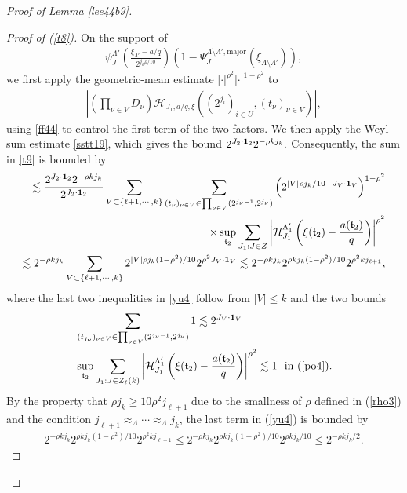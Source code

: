 \documentclass[11 pt,letterpaper]{amsart}
\theoremstyle{plain}
\theoremstyle{definition}
\theoremstyle{remark} \theoremstyle{exam} \theoremstyle{ob}
\numberwithin{equation}{section}
\begin{document}
\begin{proof}[Proof of Lemma \ref{lee44b9}]
\begin{proof}[Proof of (\ref{t8})]
On the support of
\begin{align*}
	\psi_J^{\Lambda'}\left(
	\frac{\xi_{\Lambda'}-a/q}{2^{j_k\rho/10}}
	\right)
	\left(
	1-\Psi_J^{\Lambda\setminus\Lambda',\mathrm{major}}
	(\xi_{\Lambda\setminus\Lambda'})
	\right),
\end{align*}
we first apply the geometric-mean estimate
$|\cdot|^{\rho^2}|\cdot|^{1-\rho^2}$ to
\begin{align*}
	\left|\left(\prod_{\nu\in V}\bar{D}_\nu\right)
	\mathcal{H}_{J_1,a/q,\xi}
	\left(
	(2^{j_i})_{i\in U},
	(t_\nu)_{\nu\in V}
	\right)\right|,
\end{align*}
using \eqref{ff44} to control the first term of the two factors. We then apply the Weyl-sum estimate \eqref{sstt19}, which gives the bound $2^{J_2\cdot{\bf 1}_2}2^{-\rho k j_k}.$
Consequently, the sum in \eqref{t9} is bounded by
\begin{align}\label{yu4}
 \lesssim  \frac{ 2^{J_2\cdot {\bf 1}_2} 2^{-\rho k j_k}}{2^{J_2\cdot {\bf 1}_2}}   \sum_{V\subset \{\ell+1,\cdots,k\}}
 \sum_{(t_\nu)_{\nu\in V}\in \prod_{\nu\in V}(2^{j_\nu-1},2^{j_\nu})}\left(2^{|V| \rho j_k /10-J_V\cdot {\bf 1}_{V}} \right)^{1-\rho^2}\notag\\
 \times
\sup_{\mathfrak{t}_2}\sum_{J_1:J\in Z} \left|\mathcal{H}^{\Lambda'_{1}}_{J_{1}}\left(\xi(\mathfrak{t}_2)-\frac{a(\mathfrak{t}_2)}{q}\right) \right|^{\rho^2}\notag\\
 \lesssim 2^{-\rho k j_k}  \sum_{V\subset \{\ell+1,\cdots,k\}} 2^{|V| \rho j_k(1-\rho^2) /10}  2^{\rho^2 J_V\cdot {\bf 1}_V}\lesssim 2^{-\rho k j_k} 2^{  \rho k j_k(1-\rho^2) /10}  2^{\rho^2 k j_{\ell+1}},
\end{align}
where the last  two inequalities in \eqref{yu4} follow   from $|V|\le k$ and the two bounds
\begin{align*}
&\sum_{(t_{j_\nu})_{\nu\in V}\in \prod_{\nu\in V}(2^{j_\nu-1},2^{j_\nu})} 1 \lesssim 2^{J_V\cdot {\bf 1}_V}\\
&\sup_{\mathfrak{t}_2}\sum_{J_1:J\in Z_{\ell}(k)}  \left|\mathcal{H}^{\Lambda'_{1}}_{J_{1}}\left(\xi(\mathfrak{t}_2)-\frac{a(\mathfrak{t}_2)}{q}\right) \right|^{\rho^{2}} \lesssim 1 \ \text{ in (\ref{po4}).}
\end{align*}
By the property that      $\rho   j_k\ge 10  \rho^2   j_{\ell+1} $ due to the smallness of $\rho$ defined  in   (\ref{rho3}) and the condition $j_{\ell+1}\approx_{\Lambda}\cdots \approx_{\Lambda} j_{k}$,  the last term in (\ref{yu4}) is bounded by  \begin{align}\label{y7}
	2^{-\rho k j_k} 2^{  \rho k j_k(1-\rho^2) /10}  2^{\rho^2 k j_{\ell+1}}\le	2^{-\rho k j_k} 2^{  \rho k j_k(1-\rho^2) /10}  2^{\rho k j_{k}/10}\le  2^{-\rho k j_k/2}.

\end{align}
\end{proof}
\end{proof}
\end{document}
